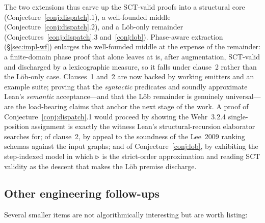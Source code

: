 The two extensions thus carve up the SCT-valid proofs into a structural
core (Conjecture~\ref{conj:dispatch}.1), a well-founded middle
(Conjecture~\ref{conj:dispatch}.2), and a Löb-only remainder
(Conjectures~\ref{conj:dispatch}.3 and~\ref{conj:lob}). Phase-aware
extraction (§\ref{sec:impl-wf}) enlarges the well-founded middle at the
expense of the remainder: a finite-domain phase proof that 
alone leaves at  is, after augmentation, SCT-valid and discharged by
a lexicographic measure, so it falls under clause~2 rather than the Löb-only
case. Clauses~1 and~2
are now backed by working emitters and an example suite; proving that the
\emph{syntactic} predicates  and 
soundly approximate Lean's \emph{semantic} acceptance---and that the Löb
remainder is genuinely universal---are the load-bearing claims that anchor
the next stage of the work. A proof of Conjecture~\ref{conj:dispatch}.1
would proceed by showing the Wehr~3.2.4 single-position assignment is
exactly the witness Lean's structural-recursion elaborator searches for;
of clause~2, by appeal to the soundness of the Lee~2009 ranking schemas
against the input graphs; and of Conjecture~\ref{conj:lob}, by exhibiting
the step-indexed model in which \(\triangleright\) is the strict-order
approximation and reading SCT validity as the descent that makes the Löb
premise discharge.

\subsection{Other engineering follow-ups}

Several smaller items are not algorithmically interesting but are
worth listing:

